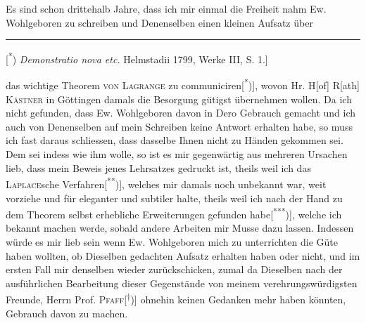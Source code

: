 \indent Es sind schon drittehalb Jahre, dass ich mir einmal die Freiheit nahm Ew. Wohlgeboren zu schreiben und Denenselben einen kleinen Aufsatz über
\par\medskip\noindent\rule{.24\linewidth}{.4pt}\par\smallskip
{\small
\noindent\hspace*{\parindent}[\textsuperscript{*}) \textit{Demonstratio nova etc.} Helmstadii 1799, Werke III, S. 1.]
\par}
\clearpage{}
\noindent das wichtige Theorem \textsc{von Lagrange} zu communiciren[\textsuperscript{*})], wovon Hr. H[of] R[ath] \textsc{Kästner} in Göttingen damals die Besorgung gütigst übernehmen wollen. Da ich nicht gefunden, dass Ew. Wohlgeboren davon in Dero  Gebrauch gemacht und ich auch von Denenselben auf mein Schreiben keine Antwort erhalten habe, so muss ich fast daraus schliessen, dass dasselbe Ihnen nicht zu Händen gekommen sei. Dem sei indess wie ihm wolle, so ist es mir gegenwärtig aus mehreren Ursachen lieb, dass mein Beweis jenes Lehrsatzes  gedruckt ist, theils weil ich das \textsc{Laplace}sche Verfahren[\textsuperscript{**})], welches mir damals noch unbekannt war, weit vorziehe und für eleganter und subtiler halte, theils weil ich nach der Hand zu dem Theorem selbst erhebliche Erweiterungen gefunden habe[\textsuperscript{***})], welche ich bekannt machen werde, sobald andere Arbeiten mir Musse dazu lassen. Indessen würde es mir lieb sein wenn Ew. Wohlgeboren mich zu unterrichten die Güte haben wollten, ob Dieselben gedachten Aufsatz erhalten haben oder nicht, und im ersten Fall mir denselben wieder zurückschicken, zumal da Dieselben nach der ausführlichen Bearbeitung dieser Gegenstände von meinem verehrungswürdigsten Freunde, Herrn Prof. \textsc{Pfaff}[\textsuperscript{\ensuremath{\dagger}})] ohnehin keinen Gedanken mehr haben könnten, Gebrauch davon zu machen.

